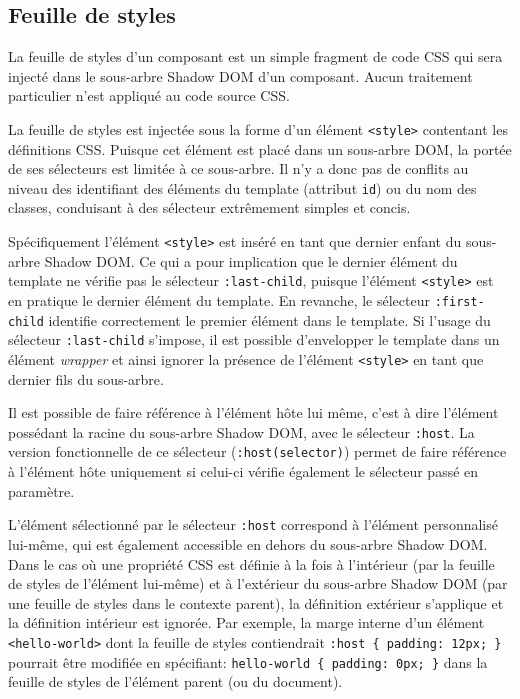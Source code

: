 \subsection{Feuille de styles} \label{sec:web-specs-stylesheet}
La feuille de styles d'un composant est un simple fragment de code CSS qui sera injecté dans le sous-arbre Shadow DOM d'un composant. Aucun traitement particulier n'est appliqué au code source CSS.

La feuille de styles est injectée sous la forme d'un élément \texttt{<style>} contentant les définitions CSS. Puisque cet élément est placé dans un sous-arbre DOM, la portée de ses sélecteurs est limitée à ce sous-arbre. Il n'y a donc pas de conflits au niveau des identifiant des éléments du template (attribut \texttt{id}) ou du nom des classes, conduisant à des sélecteur extrêmement simples et concis.

Spécifiquement l'élément \texttt{<style>} est inséré en tant que dernier enfant du sous-arbre Shadow DOM. Ce qui a pour implication que le dernier élément du template ne vérifie pas le sélecteur \texttt{:last-child}, puisque l'élément \texttt{<style>} est en pratique le dernier élément du template. En revanche, le sélecteur \texttt{:first-child} identifie correctement le premier élément dans le template. Si l'usage du sélecteur \texttt{:last-child} s'impose, il est possible d'envelopper le template dans un élément \emph{wrapper} et ainsi ignorer la présence de l'élément \texttt{<style>} en tant que dernier fils du sous-arbre.

Il est possible de faire référence à l'élément hôte lui même, c'est à dire l'élément possédant la racine du sous-arbre Shadow DOM, avec le sélecteur \texttt{:host}. La version fonctionnelle de ce sélecteur (\texttt{:host(selector)}) permet de faire référence à l'élément hôte uniquement si celui-ci vérifie également le sélecteur passé en paramètre.

L'élément sélectionné par le sélecteur \texttt{:host} correspond à l'élément personnalisé lui-même, qui est également accessible en dehors du sous-arbre Shadow DOM. Dans le cas où une propriété CSS est définie à la fois à l'intérieur (par la feuille de styles de l'élément lui-même) et à l'extérieur du sous-arbre Shadow DOM (par une feuille de styles dans le contexte parent), la définition extérieur s'applique et la définition intérieur est ignorée. Par exemple, la marge interne d'un élément \texttt{<hello-world>} dont la feuille de styles contiendrait \texttt{:host \{ padding: 12px; \}} pourrait être modifiée en spécifiant: \texttt{hello-world \{ padding: 0px; \}} dans la feuille de styles de l'élément parent (ou du document).

